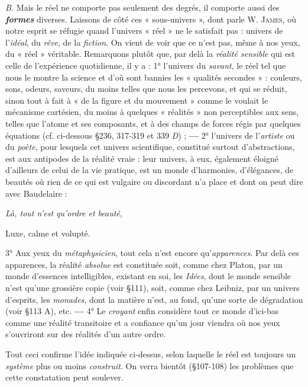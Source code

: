 {\it B.} Mais le réel ne comporte pas seulement des degrés, il comporte
aussi des \textbf{\textit {formes}} diverses. Laissons de côté ces « sous-univers », dont
parle W. \textsc{James}, où notre esprit se réfugie quand l’univers « réel » ne
le satisfait pas : univers de l’{\it idéal}, du {\it rêve}, de la {\it fiction}. On vient de
voir que ce n’est pas, même à nos yeux, du « réel » véritable. Remarquons
plutôt que, par delà la {\it réalité sensible} qui est celle de l’expérience
quotidienne, il y a : 1° l’univers du {\it savant}, le réel tel que nous
le montre la science et d’où sont bannies les « qualités secondes » :
couleurs, sons, odeurs, saveurs, du moins telles que nous les percevons,
et qui se réduit, sinon tout à fait à « de la figure et du mouvement »
comme le voulait le mécanisme cartésien, du moins à quelques
« réalités » non perceptibles aux sens, telles que l’atome et ses composants,
et à des champs de forces régis par quelques équations (cf. ci-dessous
\S 236, 317-319 et 339 {\it D}) ; {\bf —} 2° l'univers de l’{\it artiste} ou du
 {\it poète}, pour lesquels cet univers scientifique, constitué surtout d’abstractions,
est aux antipodes de la réalité vraie : leur univers, à eux,
également éloigné d’ailleurs de celui de la vie pratique, est un monde
d’harmonies, d’élégances, de beautés où rien de ce qui est vulgaire
ou discordant n’a place et dont on peut dire avec Baudelaire :

\begin{center}
{\it Là, tout n’est qu’ordre et beauté,

Luxe, calme et volupté.}
\end{center}

3° Aux yeux du {\it métaphysicien}, tout cela n’est encore qu’{\it apparences}.
Par delà ces apparences, la réalité {\it absolue} est constituée soit, comme
chez Platon, par un monde d’essences intelligibles, existant en soi,
les {\it Idées}, dont le monde sensible n’est qu’une grossière copie (voir
\S 111), soit, comme chez Leibniz, par un univers d’esprits, les {\it monades},
dont la matière n’est, au fond, qu’une sorte de dégradation (voir
\S 113 A), etc. {\bf —} 4° Le {\it croyant} enfin considère tout ce monde d’ici-bas
comme une réalité transitoire et a confiance qu’un jour viendra
où nos yeux s’ouvriront sur des réalités d’un autre ordre.

Tout ceci confirme l’idée indiquée ci-dessus, selon laquelle le réel
est toujours un {\it système} plus ou moins {\it construit}. On verra bientôt
(\S 107-108) les problèmes que cette constatation peut soulever.

